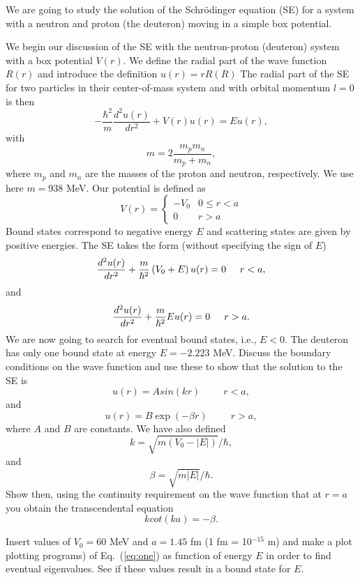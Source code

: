 \begin{prob}
We are going to study the solution of 
the Schr\"odinger equation (SE)
for a system with a neutron and proton (the deuteron)
moving in  a simple box potential. 

We begin our discussion  of the SE with 
the neutron-proton (deuteron) system
with a box potential $V(r)$. 
We define the radial part of the wave function $R(r)$ and introduce
the definition $u(r)=rR(R)$
The radial part of the 
SE for two particles in their
center-of-mass system and with orbital momentum $l=0$ is then 
\[
   -\frac{\hbar^2}{m}\frac{d^2u(r)}{dr^2}+V(r)u(r)=Eu(r),
\]
with 
\[
   m=2\frac{m_pm_n}{m_p+m_n},
\]
where $m_p$ and $m_n$ are the masses of the proton and neutron, 
respectively. We use here $m=938$ MeV. 
Our potential is defined as 
\[
V(r)=\left\{ \begin{array}{cc} -V_0& 0 \le r < a \\
                                0  & r > a \end{array} \right.
\]
Bound states correspond to negative energy $E$ and scattering states
are given by positive energies.
The SE takes the form (without specifying the sign of $E$)
\[
   \frac{d^2u(r)}{dr^2}+\frac{m}{\hbar^2}\left(V_0+E\right)u(r)=0\hspace{0.5cm} r < a,
\]
and 
\[
   \frac{d^2u(r)}{dr^2}+\frac{m}{\hbar^2}Eu(r)=0\hspace{0.5cm} r > a.
\]
We are now going to search for eventual bound states,
i.e., $E< 0$. The deuteron has only one bound
state at energy $E=-2.223$ MeV. Discuss the boundary conditions
on the wave function and use these to
show that the solution to the SE is
\[
   u(r)=Asin(kr) \hspace{1cm} r < a,
\]
and 
\[
   u(r)=B\exp{(-\beta r)} \hspace{1cm} r > a,
\]
where $A$ and $B$ are constants. We have also defined
\[
   k=\sqrt{m(V_0-|E|)}/\hbar,
\]
and 
\[
   \beta=\sqrt{m|E|}/\hbar.
\]
Show then, using the continuity requirement on the wave function that at $r=a$ 
you obtain the transcendental equation
\begin{equation}
   kcot(ka)=-\beta. 
   \label{eq:one}
\end{equation}

Insert values of $V_0=60$ MeV and $a=1.45$ fm (1 fm = 10$^{-15}$ m) 
and make a plot
plotting programs) of Eq.\ (\ref{eq:one}) as function of energy $E$
in order to find eventual eigenvalues.
See if these values result in a bound state for $E$.


\end{prob}
